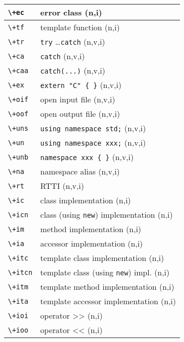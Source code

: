 \documentclass[oneside,11pt,landscape,DIV16]{scrartcl}
\begin{document}
\begin{multicols}{3}
\begin{center}
\begin{tabular}[]{|p{12mm}|p{60mm}|}
\hline \verb'\+ec'  & error class                          \hfill (n,i)\\
\hline \verb'\+tf'  & template function                    \hfill (n,i)\\
\hline
\hline \verb'\+tr'  & \verb'try' \dots \verb'catch'        \hfill (n,v,i)\\
\hline \verb'\+ca'  & \verb'catch'                         \hfill (n,v,i)\\
\hline \verb'\+caa' & \verb'catch(...)'                    \hfill (n,v,i)\\
\hline
\hline \verb'\+ex'  & \verb'extern "C" { }'                \hfill (n,v,i)\\
\hline \verb'\+oif' & open input file                      \hfill (n,v,i)\\
\hline \verb'\+oof' & open output file                     \hfill (n,v,i)\\
\hline \verb'\+uns' & \verb'using namespace std;'          \hfill (n,v,i)\\
\hline \verb'\+un'  & \verb'using namespace xxx;'          \hfill (n,v,i)\\
\hline \verb'\+unb' & \verb'namespace xxx { }'             \hfill (n,v,i)\\
\hline \verb'\+na'  & namespace alias                      \hfill (n,v,i)\\
\hline \verb'\+rt'  & RTTI                                 \hfill (n,v,i)\\
%
\hline
\hline \verb'\+ic'  & class  implementation                   \hfill (n,i)\\
\hline \verb'\+icn' & class (using \verb'new') implementation \hfill (n,i)\\
\hline \verb'\+im'  & method implementation                   \hfill (n,i)\\
\hline \verb'\+ia'  & accessor implementation                 \hfill (n,i)\\
\hline \verb'\+itc' & template class  implementation          \hfill (n,i)\\
\hline \verb'\+itcn'& template class (using \verb'new') impl. \hfill (n,i)\\
\hline \verb'\+itm' & template method implementation          \hfill (n,i)\\
\hline \verb'\+ita' & template accessor implementation        \hfill (n,i)\\
\hline \verb'\+ioi' & operator >>                             \hfill (n,i)\\
\hline \verb'\+ioo' & operator <<                             \hfill (n,i)\\

\end{tabular}
\end{center}
\end{multicols}
\end{document}

